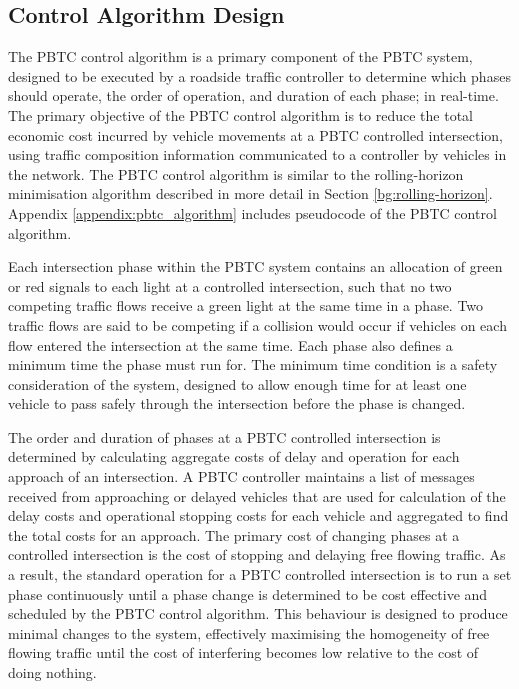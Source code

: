 \subsection {Control Algorithm Design}
\label{sec:PBTCDesign}

The PBTC control algorithm is a primary component of the PBTC system, designed to be executed by a roadside traffic controller to determine which phases should operate, the order of operation, and duration of each phase; in real-time. The primary objective of the PBTC control algorithm is to reduce the total economic cost incurred by vehicle movements  at a PBTC controlled intersection, using traffic composition information communicated to a controller by vehicles in the network. The PBTC control algorithm is similar to the rolling-horizon minimisation algorithm described in more detail in Section \ref{bg:rolling-horizon}. Appendix \ref{appendix:pbtc_algorithm} includes pseudocode of the PBTC control algorithm.

Each intersection phase within the PBTC system contains an allocation of green or red signals to each light at a controlled intersection, such that no two competing traffic flows receive a green light at the same time in a phase. Two traffic flows are said to be competing if a collision would occur if vehicles on each flow entered the intersection at the same time. Each phase also defines a minimum time the phase must run for.  The minimum time condition is a safety consideration of the system, designed to allow enough time for at least one vehicle to pass safely through the intersection before the phase is changed. 

The order and duration of phases at a PBTC controlled intersection is determined by calculating aggregate costs of delay and operation for each approach of an intersection. A PBTC controller maintains a list of messages received from approaching or delayed vehicles that are used for calculation of the delay costs and operational stopping costs for each vehicle and aggregated to find the total costs for an approach. The primary cost of changing phases at a controlled intersection is the cost of stopping and delaying free flowing traffic. As a result, the standard operation for a PBTC controlled intersection is to run a set phase continuously until a phase change is determined to be cost effective and scheduled by the PBTC control algorithm. This behaviour is designed to produce minimal changes to the system, effectively maximising the homogeneity of free flowing traffic until the cost of interfering becomes low relative to the cost of doing nothing. 

